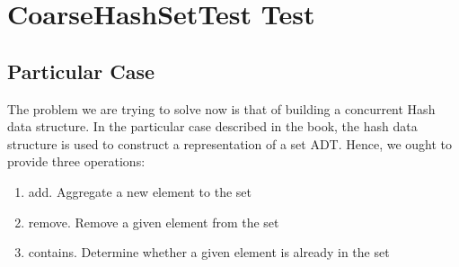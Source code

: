\section{\textbf{CoarseHashSetTest Test}}
\subsection{Particular Case}
\par
The problem we are trying to solve now is that of building a concurrent Hash
data structure. In the particular case described in the book, the hash data
structure is used to construct a representation of a set ADT. Hence, we ought
to provide three operations:
\par
\begin{enumerate}
\item add. Aggregate a new element to the set
\item remove. Remove a given element from the set
\item contains. Determine whether a given element is already in the set
\end{enumerate}
\par
